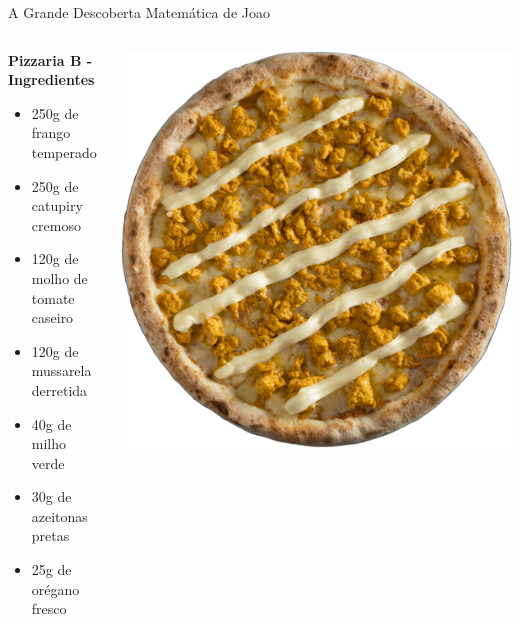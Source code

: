 \documentclass[12pt]{beamer}
\begin{document}
    \begin{frame}{A Grande Descoberta Matemática de Joao}
    
        \begin{columns}
        \begin{column}{0.6\textwidth}
       
            \textbf{Pizzaria B - Ingredientes}

            \begin{itemize}
                \item [1.] 250g de frango temperado
                \item [2.] 250g de catupiry cremoso
                \item [3.] 120g de molho de tomate caseiro
                \item [4.] 120g de mussarela derretida
                \item [5.] 40g de milho verde
                \item [6.] 30g de azeitonas pretas
                \item [7.] 25g de orégano fresco
            \end{itemize}
        \end{column}

        \begin{column}{0.4\textwidth}
            \centering
            \includegraphics[width=0.8\linewidth]{imagens/pizza_1.png}
        \end{column}
    \end{columns}
        
    \end{frame}
    
\end{document}
